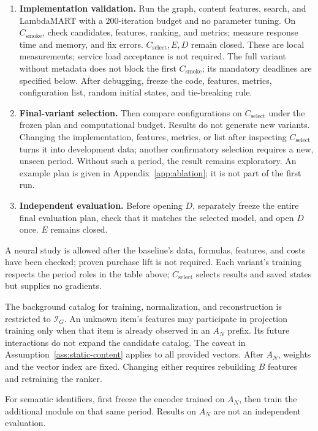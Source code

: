 \documentclass[12pt,a4paper]{article}
\theoremstyle{plainru}
\begin{document}
\begin{enumerate}[leftmargin=*]
\item \textbf{Implementation validation.}
Run the graph, content features, search, and LambdaMART
with a $200$-iteration budget and no parameter tuning. On $C_{\mathrm{smoke}}$, check candidates,
features, ranking, and metrics; measure response time and memory,
and fix errors. $C_{\mathrm{select}},E,D$ remain closed.
These are local measurements; service load acceptance is not required.
The full variant without metadata does not block the first
$C_{\mathrm{smoke}}$; its mandatory deadlines are specified below.
After debugging, freeze the code, features, metrics, configuration list,
random initial states, and tie-breaking rule.
\item \textbf{Final-variant selection.}
Then compare configurations on $C_{\mathrm{select}}$ under the frozen plan
and computational budget. Results do not generate new variants.
Changing the implementation, features, metrics, or list after inspecting
$C_{\mathrm{select}}$ turns it into development data; another
confirmatory selection requires a new, unseen period.
Without such a period, the result remains exploratory.
An example plan is given
in Appendix~\ref{app:ablation}; it is not part of the first run.
\item \textbf{Independent evaluation.}
Before opening $D$, separately freeze the entire final evaluation plan,
check that it matches the selected model, and open $D$ once.
$E$ remains closed.
\end{enumerate}

A neural study is allowed after the baseline's data, formulas,
features, and costs have been checked; proven purchase lift is not required.
Each variant's training respects the period roles in the table above;
$C_{\mathrm{select}}$ selects results and saved states
but supplies no gradients.

The background catalog for training, normalization, and reconstruction is restricted
to $\mathcal I_G$. An unknown item's features may participate in projection
training only when that item is already observed in an $A_N$ prefix.
Its future interactions do not expand the candidate catalog.
The caveat in Assumption~\ref{ass:static-content}
applies to all provided vectors.
After $A_N$, weights and the vector index are fixed. Changing either
requires rebuilding $B$ features and retraining the ranker.

For semantic identifiers, first freeze the encoder
trained on $A_N$, then train the additional module
on that same period. Results on $A_N$ are not an independent evaluation.
\end{document}
